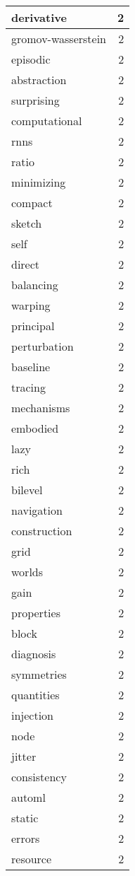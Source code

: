 \begin{table}[h]
\begin{tabular}{|l|r|}
\hline
derivative & 2 \\
\hline
gromov-wasserstein & 2 \\
\hline
episodic & 2 \\
\hline
abstraction & 2 \\
\hline
surprising & 2 \\
\hline
computational & 2 \\
\hline
rnns & 2 \\
\hline
ratio & 2 \\
\hline
minimizing & 2 \\
\hline
compact & 2 \\
\hline
sketch & 2 \\
\hline
self & 2 \\
\hline
direct & 2 \\
\hline
balancing & 2 \\
\hline
warping & 2 \\
\hline
principal & 2 \\
\hline
perturbation & 2 \\
\hline
baseline & 2 \\
\hline
tracing & 2 \\
\hline
mechanisms & 2 \\
\hline
embodied & 2 \\
\hline
lazy & 2 \\
\hline
rich & 2 \\
\hline
bilevel & 2 \\
\hline
navigation & 2 \\
\hline
construction & 2 \\
\hline
grid & 2 \\
\hline
worlds & 2 \\
\hline
gain & 2 \\
\hline
properties & 2 \\
\hline
block & 2 \\
\hline
diagnosis & 2 \\
\hline
symmetries & 2 \\
\hline
quantities & 2 \\
\hline
injection & 2 \\
\hline
node & 2 \\
\hline
jitter & 2 \\
\hline
consistency & 2 \\
\hline
automl & 2 \\
\hline
static & 2 \\
\hline
errors & 2 \\
\hline
resource & 2 \\

\end{tabular}
\end{table}
